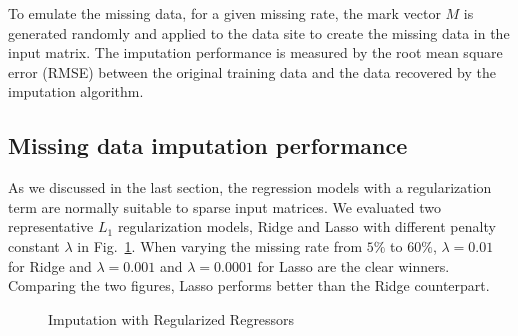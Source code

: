 To emulate the missing data, for a given missing rate, the mark vector $M$ is generated randomly and applied to the data site to create the 
missing data in the input matrix. The imputation performance is measured by the root mean square error (RMSE) between the original training data and the data recovered by the imputation algorithm. 


\subsection{Missing data imputation performance}
\label{subsec:im}
As we discussed in the last section, the regression models with a regularization term are normally suitable to sparse input matrices.
We evaluated two representative $L_1$ regularization models, Ridge and Lasso with different penalty constant $\lambda$ in Fig.~\ref{fig:rmse:regu}.
When varying the missing rate from $5\%$ to $60\%$, $\lambda = 0.01$ for Ridge and $\lambda = 0.001$ and $\lambda = 0.0001$ for Lasso are the clear 
winners. Comparing the two figures, Lasso performs better than the Ridge counterpart.

  \begin{figure}[!ht]
    \hfill
    \caption{Imputation with Regularized Regressors}
    \label{fig:rmse:regu}
  \end{figure}

